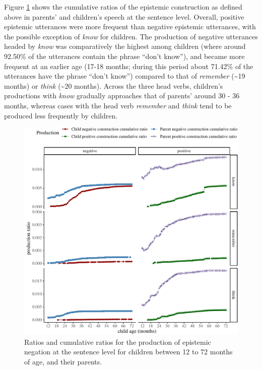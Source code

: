 \documentclass[
  english,
  man,floatsintext]{apa6}
\begin{document}
Figure \ref{fig:epistemic} shows the cumulative ratios of the epistemic construction as defined above in parents' and children's speech at the sentence level. Overall, positive epistemic utterances were more frequent than negative epistemic utterances, with the possible exception of \emph{know} for children. The production of negative utterances headed by \emph{know} was comparatively the highest among children (where around 92.50\% of the utterances contain the phrase ``don't know''), and became more frequent at an earlier age (17-18 months; during this period about 71.42\% of the utterances have the phrase ``don't know'') compared to that of \emph{remember} (\textasciitilde19 months) or \emph{think} (\textasciitilde20 months). Across the three head verbs, children's productions with \emph{know} gradually approaches that of parents' around 30 - 36 months, whereas cases with the head verb \emph{remember} and \emph{think} tend to be produced less frequently by children.

\begin{figure}[H]

{\centering \includegraphics{neg_construction_article_files/figure-latex/epistemic-1} 

}

\caption{Ratios and cumulative ratios for the production of epistemic negation at the sentence level for children between 12 to 72 months of age, and their parents.}\label{fig:epistemic}
\end{figure}
\end{document}

